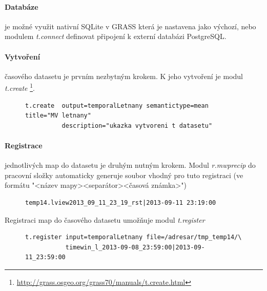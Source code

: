 \documentclass[a4paper,12pt,oneside]{report}
\begin{document}
\paragraph*{Databáze} je možné využit nativní SQLite v GRASS která je nastavena jako výchozí, nebo modulem \textit{t.connect} definovat připojení k externí databázi PostgreSQL.

\paragraph*{Vytvoření } časového  datasetu je prvním nezbytným krokem. K jeho vytvoření je modul \textit{t.create} \footnote{\url{http://grass.osgeo.org/grass70/manuals/t.create.html}}.
\begin{figure}[h!]
\begin{footnotesize}
\lstset{extendedchars=false,
escapeinside=''}
\begin{lstlisting}[style=mybash]
t.create  output=temporalLetnany semantictype=mean title="MV letnany"
          description="ukazka vytvoreni t datasetu"                        
\end{lstlisting}
\end{footnotesize} 
\end{figure}

\paragraph*{Registrace} jednotlivých map do datasetu je druhým nutným krokem. Modul \textit{r.mwprecip} do pracovní složky automaticky generuje soubor vhodný pro tuto registraci (ve formátu "<název mapy><separátor><časová známka>")
\begin{figure}[h!]
\begin{footnotesize}
\lstset{extendedchars=false,
escapeinside=''}
\begin{lstlisting}[style=mybash]
temp14.lview2013_09_11_23_19_rst|2013-09-11 23:19:00                       
\end{lstlisting}
\end{footnotesize} 
\end{figure}

Registraci map do časového datasetu umožňuje modul \textit{t.register}
\begin{figure}[h!]
\begin{footnotesize}
\lstset{extendedchars=false,
escapeinside=''}
\begin{lstlisting}[style=mybash]
t.register input=temporalLetnany file=/adresar/tmp_temp14/\
           timewin_l_2013-09-08_23:59:00|2013-09-11_23:59:00        
\end{lstlisting}
\end{footnotesize} 
\end{figure}
\end{document}
